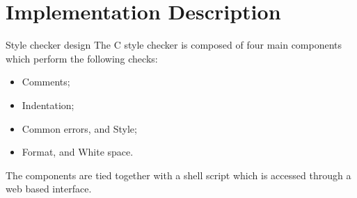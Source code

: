 \documentclass[compress]{beamer}
\begin{document}

\section{Implementation Description}


\begin{frame}{Style checker design}
    The C style checker is composed of four main components which perform the following
    checks:
    \begin{itemize}
        \item Comments;
        \item Indentation;
        \item Common errors, and Style;
        \item Format, and White space.
    \end{itemize}
        The components are tied together with a shell script which is accessed
    through a web based interface.
\end{frame}


\end{document}
